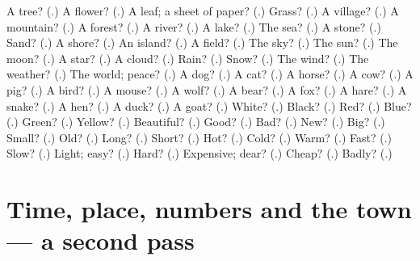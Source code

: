 \begin{tcolorbox}[breakable,colback=teal!4,colframe=teal!35!black,title={Before you move on}]
A tree? (\textbf{}.) A flower? (\textbf{}.) A leaf; a sheet of paper? (\textbf{}.) Grass? (\textbf{}.) A village? (\textbf{}.) A mountain? (\textbf{}.) A forest? (\textbf{}.) A river? (\textbf{}.) A lake? (\textbf{}.) The sea? (\textbf{}.) A stone? (\textbf{}.) Sand? (\textbf{}.) A shore? (\textbf{}.) An island? (\textbf{}.) A field? (\textbf{}.) The sky? (\textbf{}.) The sun? (\textbf{}.) The moon? (\textbf{}.) A star? (\textbf{}.) A cloud? (\textbf{}.) Rain? (\textbf{}.) Snow? (\textbf{}.) The wind? (\textbf{}.) The weather? (\textbf{}.) The world; peace? (\textbf{}.) A dog? (\textbf{}.) A cat? (\textbf{}.) A horse? (\textbf{}.) A cow? (\textbf{}.) A pig? (\textbf{}.) A bird? (\textbf{}.) A mouse? (\textbf{}.) A wolf? (\textbf{}.) A bear? (\textbf{}.) A fox? (\textbf{}.) A hare? (\textbf{}.) A snake? (\textbf{}.) A hen? (\textbf{}.) A duck? (\textbf{}.) A goat? (\textbf{}.) White? (\textbf{}.) Black? (\textbf{}.) Red? (\textbf{}.) Blue? (\textbf{}.) Green? (\textbf{}.) Yellow? (\textbf{}.) Beautiful? (\textbf{}.) Good? (\textbf{}.) Bad? (\textbf{}.) New? (\textbf{}.) Big? (\textbf{}.) Small? (\textbf{}.) Old? (\textbf{}.) Long? (\textbf{}.) Short? (\textbf{}.) Hot? (\textbf{}.) Cold? (\textbf{}.) Warm? (\textbf{}.) Fast? (\textbf{}.) Slow? (\textbf{}.) Light; easy? (\textbf{}.) Hard? (\textbf{}.) Expensive; dear? (\textbf{}.) Cheap? (\textbf{}.) Badly? (\textbf{}.)
\end{tcolorbox}
\section[(dialogue)]{Time, place, numbers and the town — a second pass}

\label{lesson:RU-R80-second-pass-time-place-numbers-and-the-town}



